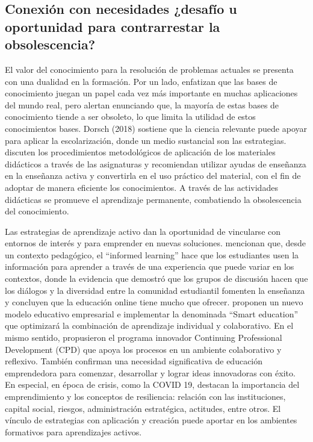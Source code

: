 \documentclass[spanish]{textolivre}
\begin{document}
\subsection{Conexión con necesidades ¿desafío u oportunidad para contrarrestar la obsolescencia?}\label{sec-fmt-manuscrito}
El valor del conocimiento para la resolución de problemas actuales se presenta con una dualidad en la formación. Por un lado,  \textcite{liang_how_2017} enfatizan que las bases de conocimiento juegan un papel cada vez más importante en muchas aplicaciones del mundo real, pero alertan enunciando que, la mayoría de estas bases de conocimiento tiende a ser obsoleto, lo que limita la utilidad de estos conocimientos bases. Dorsch (2018) sostiene que la ciencia relevante puede apoyar para aplicar la escolarización, donde un medio sustancial son las estrategias. \textcite{visnic_evaluation_2017} discuten los procedimientos metodológicos de aplicación de los materiales didácticos a través de las asignaturas y recomiendan utilizar ayudas de enseñanza en la enseñanza activa y convertirla en el uso práctico del material, con el fin de adoptar de manera eficiente los conocimientos. A través de las actividades didácticas se promueve el aprendizaje permanente, combatiendo la obsolescencia del conocimiento.

Las estrategias de aprendizaje activo dan la oportunidad de vincularse con entornos de interés y para emprender en nuevas soluciones. \textcite{webster_distance_2017} mencionan que, desde un contexto pedagógico, el “informed learning” hace que los estudiantes usen la información  para aprender a través de una experiencia que puede variar en los contextos, donde la evidencia que demostró que los grupos de discusión hacen que los diálogos y la diversidad entre la comunidad estudiantil fomenten la enseñanza y concluyen que la educación online tiene mucho que ofrecer. \textcite{roslina_role_2017} proponen un nuevo modelo educativo empresarial e implementar la denominada “Smart education” que optimizará la combinación de aprendizaje individual y colaborativo. En el mismo sentido, \textcite{kartal_improving_2018} propusieron el programa innovador Continuing Professional Development (CPD) que apoya los procesos en un ambiente colaborativo y reflexivo. También \textcite{vaicekauskaite_need_2018} confirman una necesidad significativa de educación emprendedora para comenzar, desarrollar y lograr ideas innovadoras con éxito. En especial, en época de crisis, como la COVID 19, \textcite{portuguez_castro_being_2020} destacan la importancia del emprendimiento y los conceptos de resiliencia:  relación con las instituciones, capital social, riesgos, administración estratégica, actitudes, entre otros. El vínculo de estrategias con aplicación y creación puede aportar en los ambientes formativos para aprendizajes activos.
\end{document}
